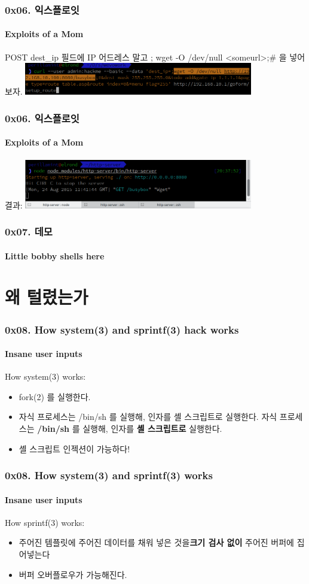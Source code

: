 \documentclass {beamer}
\begin{document}
\begin{frame}
  \frametitle{0x06. 익스플로잇}
  \framesubtitle{Exploits of a Mom}

  POST dest\_ip 필드에 IP 어드레스 말고\linebreak
  ; wget -O /dev/null <someurl>;\# 을 넣어 보자.
  \includegraphics [width=100mm]{img/webs_shellinject_curl.png}
\end{frame}

\begin{frame}
  \frametitle{0x06. 익스플로잇}
  \framesubtitle{Exploits of a Mom}

  결과:\linebreak
  \includegraphics [width=100mm]{img/webs_shellinject.png}
\end{frame}

\begin{frame}
  \frametitle{0x07. 데모}
  \framesubtitle{Little bobby shells here}

\end{frame}

\section[Section]{왜 털렸는가}
\begin{frame}
  \frametitle{0x08. How system(3) and sprintf(3) hack works}
  \framesubtitle{Insane user inputs}

  How system(3) works:

  \begin{itemize}
  \item<1-> fork(2) 를 실행한다.
  \item<2->
     {자식 프로세스는 /bin/sh 를 실행해, 인자를 셸 스크립트로 실행한다.}
     {자식 프로세스는 \textbf{/bin/sh} 를 실행해, 인자를 \textbf{셸 스크립트로} 실행한다.}
  \item<4-> 셸 스크립트 인젝션이 가능하다!
  \end{itemize}
\end{frame}

\begin{frame}
  \frametitle{0x08. How system(3) and sprintf(3) works}
  \framesubtitle{Insane user inputs}

  How sprintf(3) works:

  \begin{itemize}
  \item<1->주어진 템플릿에 주어진 데이터를 채워 넣은 것을\linebreak\textbf{크기 검사 없이} 주어진 버퍼에 집어넣는다
  \item<2->버퍼 오버플로우가 가능해진다.
  \end{itemize}
\end{frame}
\end{document}
